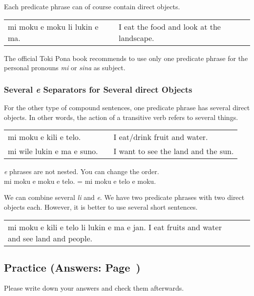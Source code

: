 Each predicate phrase can of course contain direct objects. 

\begin{supertabular}{p{5,5cm}|ll}
mi moku e moku li lukin e ma. && I eat the food and look at the landscape. \\
\end{supertabular} 

The official Toki Pona book recommends to use only one predicate phrase for the personal pronouns \textit{mi} or \textit{sina} as subject. 
%
\label{'multiple_e'}
\subsubsection*{Several \textit{e} Separators for Several direct Objects}
%
For the other type of compound sentences, one predicate phrase has several direct objects. 
In other words, the action of a transitive verb refers to several things. 

\begin{supertabular}{p{5,5cm}|ll}
mi moku e kili e telo. && I eat/drink fruit and water. \\
mi wile lukin e ma e suno. && I want to see the land and the sun. \\
\end{supertabular}
 
\textit{e} phrases are not nested. You can change the order. \\
mi moku e moku e telo. = mi moku e telo e moku. 

We can combine several \textit{li} and \textit{e}.
We have two predicate phrases with two direct objects each. 
However, it is better to use several short sentences. 

\begin{supertabular}{p{5,5cm}|ll}
mi moku e kili e telo li lukin e ma e jan. I eat fruits and water and see land and people. \\
\end{supertabular} 

%
\newpage
\subsection*{Practice (Answers: Page~\pageref{'direct_objects_compund_sentences'})}
%
Please write down your answers and check them afterwards. 

